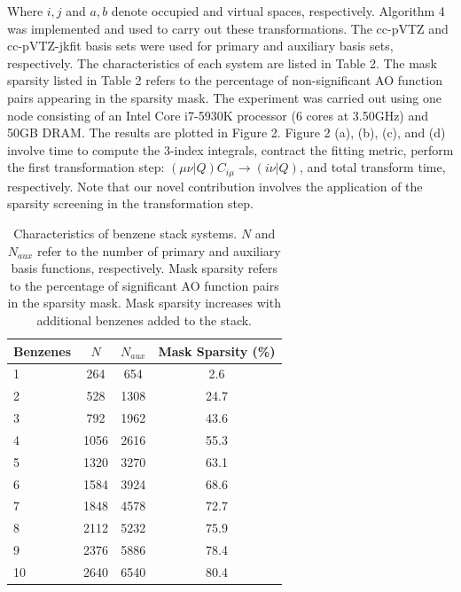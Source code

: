 \noindent Where $i, j$ and $a, b$ denote occupied and virtual spaces, respectively. 
Algorithm 4 was implemented and used to carry out these transformations.
The cc-pVTZ and cc-pVTZ-jkfit basis sets were used for primary 
and auxiliary basis sets, respectively. The characteristics
of each system are listed in Table 2. The mask sparsity listed in Table 2 refers to the percentage of non-significant AO function pairs appearing in the sparsity mask.
The experiment was carried out using one node consisting of an Intel Core i7-5930K processor 
(6 cores at 3.50GHz) and 50GB DRAM. The results are plotted in Figure 2. Figure 2 (a), (b), (c), and (d) involve time to compute the 3-index integrals, contract the fitting metric,
perform the first transformation step: $(\mu \nu | Q)C_{i \mu} \rightarrow (i \nu | Q)$,
and total transform time, respectively.
Note that our novel contribution involves the application of the sparsity screening in the transformation step.

\begingroup
\begin{table}[H]
\centering
\renewcommand{\baselinestretch}{1}
\caption{Characteristics of benzene stack systems. $N$ and $N_{aux}$ refer to the number of primary and auxiliary basis functions, respectively.
 Mask sparsity refers to the percentage of significant AO function pairs in the sparsity mask. Mask sparsity increases with additional benzenes added to the stack.}
\begin{tabular}{l ccc}
\multicolumn{1}{l}{\textbf{Benzenes}} &
\multicolumn{1}{c}{\textbf{$N$}} &
\multicolumn{1}{c}{\textbf{$N_{aux}$}} &
\multicolumn{1}{c}{\textbf{Mask Sparsity (\%)}} \\
\hline
1        & 264  & 654       & 2.6              \\ 
2        & 528  & 1308      & 24.7             \\ 
3        & 792  & 1962      & 43.6             \\ 
4        & 1056 & 2616      & 55.3             \\ 
5        & 1320 & 3270      & 63.1             \\ 
6        & 1584 & 3924      & 68.6             \\ 
7        & 1848 & 4578      & 72.7             \\ 
8        & 2112 & 5232      & 75.9             \\ 
9        & 2376 & 5886      & 78.4             \\ 
10       & 2640 & 6540      & 80.4             \\ 
\end{tabular}
\end{table}
\endgroup


